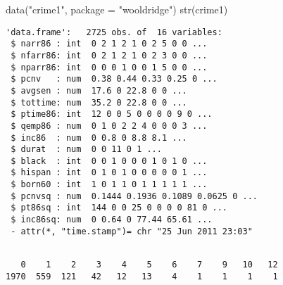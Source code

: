 \documentclass[
  letterpaper,
  DIV=11,
  numbers=noendperiod]{scrreprt}
\newenvironment{Shaded}{\begin{snugshade}}{\end{snugshade}}
\newcommand{\AttributeTok}[1]{\textcolor[rgb]{0.40,0.45,0.13}{#1}}
\newcommand{\CommentTok}[1]{\textcolor[rgb]{0.37,0.37,0.37}{#1}}
\newcommand{\DecValTok}[1]{\textcolor[rgb]{0.68,0.00,0.00}{#1}}
\newcommand{\FunctionTok}[1]{\textcolor[rgb]{0.28,0.35,0.67}{#1}}
\newcommand{\NormalTok}[1]{\textcolor[rgb]{0.00,0.23,0.31}{#1}}
\newcommand{\OtherTok}[1]{\textcolor[rgb]{0.00,0.23,0.31}{#1}}
\newcommand{\SpecialCharTok}[1]{\textcolor[rgb]{0.37,0.37,0.37}{#1}}
\newcommand{\StringTok}[1]{\textcolor[rgb]{0.13,0.47,0.30}{#1}}
\begin{document}
\begin{Shaded}
\begin{Highlighting}[]
\FunctionTok{data}\NormalTok{(}\StringTok{"crime1"}\NormalTok{, }\AttributeTok{package =} \StringTok{"wooldridge"}\NormalTok{)}
\FunctionTok{str}\NormalTok{(crime1)}
\end{Highlighting}
\end{Shaded}

\begin{verbatim}
'data.frame':   2725 obs. of  16 variables:
 $ narr86 : int  0 2 1 2 1 0 2 5 0 0 ...
 $ nfarr86: int  0 2 1 2 1 0 2 3 0 0 ...
 $ nparr86: int  0 0 0 1 0 0 1 5 0 0 ...
 $ pcnv   : num  0.38 0.44 0.33 0.25 0 ...
 $ avgsen : num  17.6 0 22.8 0 0 ...
 $ tottime: num  35.2 0 22.8 0 0 ...
 $ ptime86: int  12 0 0 5 0 0 0 0 9 0 ...
 $ qemp86 : num  0 1 0 2 2 4 0 0 0 3 ...
 $ inc86  : num  0 0.8 0 8.8 8.1 ...
 $ durat  : num  0 0 11 0 1 ...
 $ black  : int  0 0 1 0 0 0 1 0 1 0 ...
 $ hispan : int  0 1 0 1 0 0 0 0 0 1 ...
 $ born60 : int  1 0 1 1 0 1 1 1 1 1 ...
 $ pcnvsq : num  0.1444 0.1936 0.1089 0.0625 0 ...
 $ pt86sq : int  144 0 0 25 0 0 0 0 81 0 ...
 $ inc86sq: num  0 0.64 0 77.44 65.61 ...
 - attr(*, "time.stamp")= chr "25 Jun 2011 23:03"
\end{verbatim}

\begin{Shaded}
\end{Shaded}

\begin{verbatim}

   0    1    2    3    4    5    6    7    9   10   12 
1970  559  121   42   12   13    4    1    1    1    1 
\end{verbatim}

\begin{Shaded}
\end{Shaded}
\end{document}
